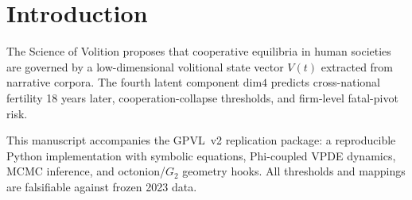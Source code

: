 \section{Introduction}
\label{sec:introduction}

The Science of Volition proposes that cooperative equilibria in human societies
are governed by a low-dimensional volitional state vector $V(t)$ extracted from
narrative corpora. The fourth latent component $\mathrm{dim4}$ predicts
cross-national fertility 18 years later, cooperation-collapse thresholds, and
firm-level fatal-pivot risk.

This manuscript accompanies the GPVL~v2 replication package: a reproducible
Python implementation with symbolic equations, Phi-coupled VPDE dynamics,
MCMC inference, and octonion/$G_2$ geometry hooks. All thresholds and mappings
are falsifiable against frozen 2023 data.
